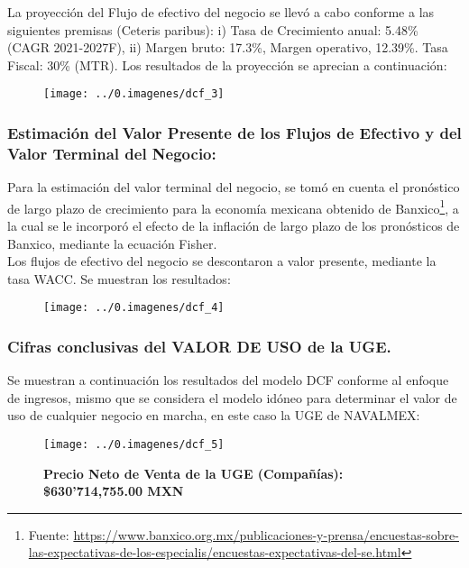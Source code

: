 La proyección del Flujo de efectivo del negocio se llevó a cabo conforme a las siguientes premisas (Ceteris paribus): i) Tasa de Crecimiento anual: 5.48\% (CAGR 2021-2027F), ii) Margen bruto: 17.3\%, Margen operativo, 12.39\%. Tasa Fiscal: 30\% (MTR). Los resultados de la proyección se aprecian a continuación:

\begin{figure}[H]
\centering
\texttt{[image: ../0.imagenes/dcf\_3]}
\end{figure}

\subsubsection{Estimación del Valor Presente de los Flujos de Efectivo y del Valor Terminal del Negocio:}

Para la estimación del valor terminal del negocio, se tomó en cuenta el pronóstico de largo plazo de crecimiento  para la economía mexicana obtenido de Banxico\footnote{Fuente: \url{https://www.banxico.org.mx/publicaciones-y-prensa/encuestas-sobre-las-expectativas-de-los-especialis/encuestas-expectativas-del-se.html}}, a la cual se le incorporó el efecto de la inflación de largo plazo de los pronósticos de Banxico, mediante la ecuación Fisher. \\

Los flujos de efectivo del negocio se descontaron a valor presente, mediante la tasa WACC. Se muestran los resultados:\\


\begin{figure}[H]
\centering
\texttt{[image: ../0.imagenes/dcf\_4]}
\end{figure}

\subsubsection{Cifras conclusivas del VALOR DE USO de la UGE.}

Se muestran a continuación los resultados del modelo DCF conforme al enfoque de ingresos, mismo que se considera el modelo idóneo para determinar el valor de uso de cualquier negocio en marcha, en este caso la UGE de NAVALMEX:\\


\begin{figure}[H]
\centering
\texttt{[image: ../0.imagenes/dcf\_5]}\vspace{10pt}

\textbullet \textcolor{principal}{\textbf{Precio Neto de Venta de la UGE (Compañías): \$630’714,755.00 MXN}}
\end{figure}